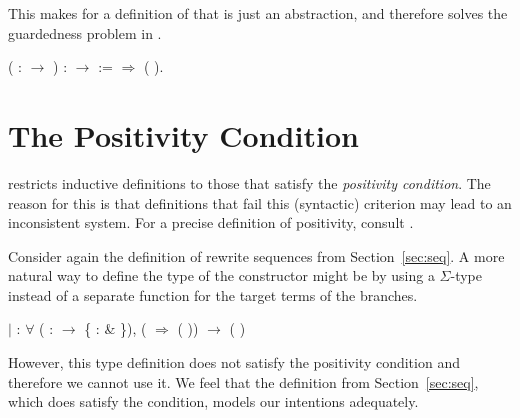 This makes for a definition of 
that is just an abstraction, and therefore solves the guardedness problem in
.
\begin{singlespace}
\begin{coqdoccode}
\coqdocnoindent
{} 
  ( :
 \ensuremath{\rightarrow} ) 
:  
 \ensuremath{\rightarrow}
 
 :=\coqdoceol
\coqdocindent{1.00em}
   \ensuremath{\Rightarrow}
 ( ).\coqdoceol
\end{coqdoccode}
\end{singlespace}


\section{The Positivity Condition}\label{sub:positivity}

\Coq restricts inductive definitions to those that satisfy the
\emph{positivity condition}. The reason for this is that definitions
that fail this (syntactic) criterion may lead to an inconsistent
  system. For a precise definition of positivity, consult
  .

Consider again the definition of rewrite sequences from
Section~\ref{sec:seq}. A more natural way to define the type of the
 constructor might be
by using a $\Sigma$-type instead of a separate function for the target
terms of the branches.
\begin{singlespace}
\begin{coqdoccode}
\coqdocindent{1.00em}
\ensuremath{|}  :
\ensuremath{\forall}  
( :
\ensuremath{\rightarrow} \{  : 
\& 
 \}),\coqdoceol
\coqdocindent{5.00em}
(  \ensuremath{\Rightarrow}
( )) 
$\rightarrow$ (
)\coqdoceol
\end{coqdoccode}
\end{singlespace}
However, this type definition does not satisfy the positivity
condition and therefore we cannot use it. We feel that the definition
from Section~\ref{sec:seq}, which does satisfy the condition, models
our intentions adequately.
